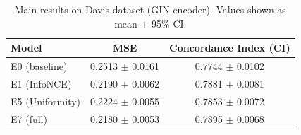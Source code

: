 \begin{table}[h]
\centering
\caption{Main results on Davis dataset (GIN encoder). Values shown as mean $\pm$ 95\% CI.}
\label{tab:main_results_ci}
\begin{tabular}{lcc}
\toprule
Model & MSE & Concordance Index (CI) \\
\midrule
E0 (baseline) & 0.2513 $\pm$ 0.0161 & 0.7744 $\pm$ 0.0102 \\
E1 (InfoNCE) & 0.2190 $\pm$ 0.0062 & 0.7881 $\pm$ 0.0081 \\
E5 (Uniformity) & 0.2224 $\pm$ 0.0055 & 0.7853 $\pm$ 0.0072 \\
E7 (full) & 0.2180 $\pm$ 0.0053 & 0.7895 $\pm$ 0.0068 \\
\bottomrule
\end{tabular}
\end{table}